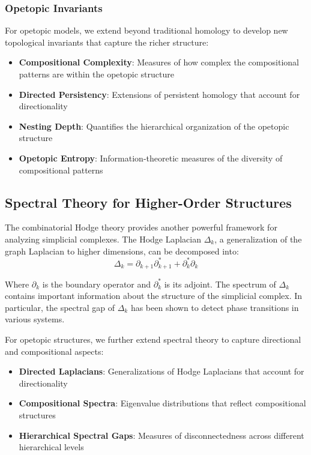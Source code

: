 \subsubsection{Opetopic Invariants}
For opetopic models, we extend beyond traditional homology to develop new topological invariants that capture the richer structure:

\begin{itemize}
    \item \textbf{Compositional Complexity}: Measures of how complex the compositional patterns are within the opetopic structure
    \item \textbf{Directed Persistency}: Extensions of persistent homology that account for directionality
    \item \textbf{Nesting Depth}: Quantifies the hierarchical organization of the opetopic structure
    \item \textbf{Opetopic Entropy}: Information-theoretic measures of the diversity of compositional patterns
\end{itemize}

\subsection{Spectral Theory for Higher-Order Structures}
The combinatorial Hodge theory provides another powerful framework for analyzing simplicial complexes. The Hodge Laplacian $\Delta_k$, a generalization of the graph Laplacian to higher dimensions, can be decomposed into:
\begin{equation}
\Delta_k = \partial_{k+1}\partial_{k+1}^* + \partial_k^*\partial_k
\end{equation}

Where $\partial_k$ is the boundary operator and $\partial_k^*$ is its adjoint. The spectrum of $\Delta_k$ contains important information about the structure of the simplicial complex. In particular, the spectral gap of $\Delta_k$ has been shown to detect phase transitions in various systems.

For opetopic structures, we further extend spectral theory to capture directional and compositional aspects:

\begin{itemize}
    \item \textbf{Directed Laplacians}: Generalizations of Hodge Laplacians that account for directionality
    \item \textbf{Compositional Spectra}: Eigenvalue distributions that reflect compositional structures
    \item \textbf{Hierarchical Spectral Gaps}: Measures of disconnectedness across different hierarchical levels
\end{itemize}

